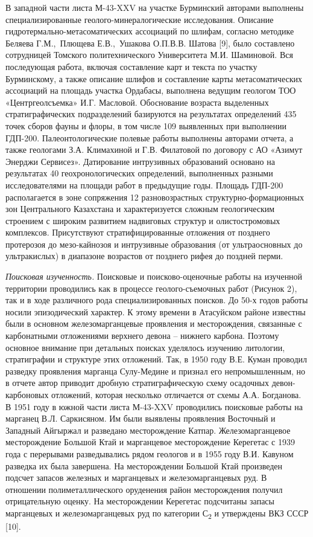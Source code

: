 В западной части листа М-43-XXV на участке Бурминский авторами выполнены
специализированные геолого-минералогические исследования. Описание
гидротермально-метасоматических ассоциаций по шлифам, согласно методике
Беляева Г.М.,~Плющева Е.В.,~Ушакова О.П.В.В. Шатова {[}9{]}, было
составлено сотрудницей Томского политехнического Университета М.И.
Шаминовой. Вся последующая работа, включая составление карт и текста по
участку Бурминскому, а также описание шлифов и составление карты
метасоматических ассоциаций на площадь участка Ордабасы, выполнена
ведущим геологом ТОО «Центргеолсъемка» И.Г. Масловой. Обоснование
возраста выделенных стратиграфических подразделений базируются на
результатах определений 435 точек сборов фауны и флоры, в том числе 109
выявленных при выполнении ГДП-200. Палеонтологические полевые работы
выполнены авторами отчета, а также геологами З.А. Климахиной и Г.В.
Филатовой по договору с АО «Азимут Энерджи Сервисез». Датирование
интрузивных образований основано на результатах 40 геохронологических
определений, выполненных разными исследователями на площади работ в
предыдущие годы. Площадь ГДП-200 располагается в зоне сопряжения 12
разновозрастных структурно-формационных зон Центрального Казахстана и
характеризуется сложным геологическим строением с широким развитием
надвиговых структур и олистостромовых комплексов. Присутствуют
стратифицированные отложения от позднего протерозоя до мезо-кайнозоя и
интрузивные образования (от ультраосновных до ультракислых) в диапазоне
возрастов от позднего рифея до поздней перми.

\emph{Поисковая изученность.} Поисковые и поисково-оценочные работы на
изученной территории проводились как в процессе геолого-съемочных работ
(Рисунок 2), так и в ходе различного рода специализированных поисков. До
50-х годов работы носили эпизодический характер. К этому времени в
Атасуйском районе известны были в основном железомарганцевые проявления
и месторождения, связанные с карбонатными отложениями верхнего девона --
нижнего карбона. Поэтому основное внимание при детальных поисках
уделялось изучению литологии, стратиграфии и структуре этих отложений.
Так, в 1950 году В.Е. Куман проводил разведку проявления марганца
Сулу-Медине и признал его непромышленным, но в отчете автор приводит
дробную стратиграфическую схему осадочных девон-карбоновых отложений,
которая несколько отличается от схемы А.А. Богданова. В 1951 году в
южной части листа М-43-XXV проводились поисковые работы на марганец В.Л.
Саркисяном. Им были выявлены проявления Восточный и Западный Айгыржал и
разведано месторождение Катпар. Железомарганцевое месторождение Большой
Ктай и марганцевое месторождение Керегетас с 1939 года с перерывами
разведывались рядом геологов и в 1955 году В.И. Кавуном разведка их была
завершена. На месторождении Большой Ктай произведен подсчет запасов
железных и марганцевых и железомарганцевых руд. В отношении
полиметаллического оруденения район месторождения получил отрицательную
оценку. На месторождении Керегетас подсчитаны запасы марганцевых и
железомарганцевых руд по категории С\textsubscript{2} и утверждены ВКЗ
СССР {[}10{]}.

